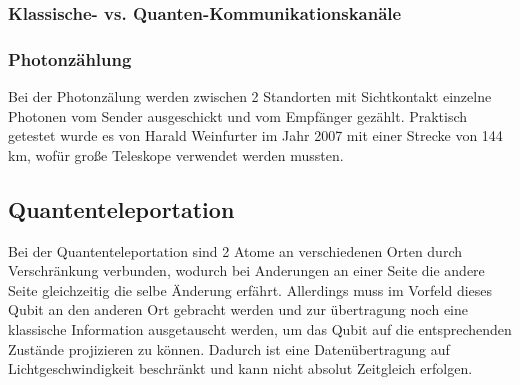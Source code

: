 \subsubsection{Klassische- vs. Quanten-Kommunikationskanäle}
\label{sec:klassich_vs_quanten}





\subsubsection{Photonzählung}
\label{sec:photonzaelung}

Bei der Photonzälung werden zwischen 2 Standorten mit Sichtkontakt einzelne Photonen vom Sender ausgeschickt und vom Empfänger gezählt. Praktisch getestet wurde es von Harald Weinfurter im Jahr 2007 mit einer Strecke von 144 km, wofür große Teleskope verwendet werden mussten.

\subsection{Quantenteleportation}
\label{sec:quantenteleportation}

Bei der Quantenteleportation sind 2 Atome an verschiedenen Orten durch Verschränkung verbunden, wodurch bei Anderungen an einer Seite die andere Seite gleichzeitig die selbe Änderung erfährt. Allerdings muss im Vorfeld dieses Qubit an den anderen Ort gebracht werden und zur übertragung noch eine klassische Information ausgetauscht werden, um das Qubit auf die entsprechenden Zustände projizieren zu können. Dadurch ist eine Datenübertragung auf Lichtgeschwindigkeit beschränkt und kann nicht absolut Zeitgleich erfolgen.

